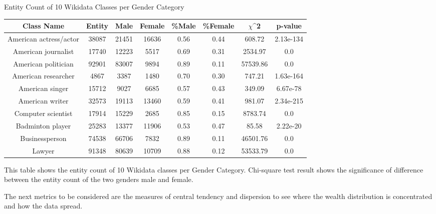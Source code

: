 \begin{center}
\small
\begin{threeparttable}
\caption{Entity Count of 10 Wikidata Classes per Gender Category}
\label{tab:gender - entity count}
\begin{tabular}{c | c c c c c c c} 

\toprule
    Class Name & Entity & Male & Female & \%Male & \%Female & $\chi$^2 & p-value \\ [0.5ex] 

\midrule
    American actress/actor & 38087 & 21451 & 16636 & 0.56 & 0.44 & 608.72 & 2.13e-134 \\
    American journalist & 17740 & 12223 & 5517 & 0.69 & 0.31 & 2534.97 & 0.0 \\
    American politician & 92901 & 83007 & 9894 & 0.89 & 0.11 & 57539.86 & 0.0 \\
    American researcher & 4867 & 3387 & 1480 & 0.70 & 0.30 & 747.21 & 1.63e-164 \\
    American singer & 15712 & 9027 & 6685 & 0.57 & 0.43 & 349.09 & 6.67e-78 \\
    American writer & 32573 & 19113 & 13460 & 0.59 & 0.41 & 981.07 & 2.34e-215 \\
    Computer scientist & 17914 & 15229 & 2685 & 0.85 & 0.15 & 8783.74 & 0.0 \\
    Badminton player & 25283 & 13377 & 11906 & 0.53 & 0.47 & 85.58 & 2.22e-20 \\
    Businessperson & 74538 & 66706 & 7832 & 0.89 & 0.11 & 46501.76 & 0.0 \\
    Lawyer & 91348 & 80639 & 10709 & 0.88 & 0.12 & 53533.79 & 0.0 \\ [1ex]
\bottomrule

\end{tabular}
\begin{tablenotes}
    \footnotesize
    This table shows the entity count of 10 Wikidata classes per Gender Category. Chi-square test result shows the significance of difference between the entity count of the two genders male and female.
\end{tablenotes}

\end{threeparttable}
\end{center}

The next metrics to be considered are the measures of central tendency and dispersion to see where the wealth distribution is concentrated and how the data spread.

